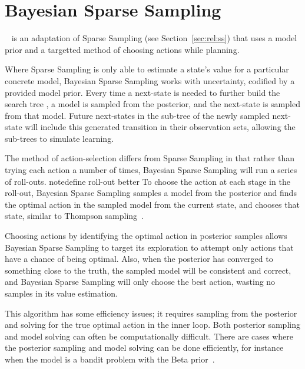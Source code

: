\section{Bayesian Sparse Sampling}

~\cite{wang05} is an adaptation of Sparse Sampling (see Section~\ref{sec:rel:ss}) that uses a model prior and a targetted method of choosing actions while planning.

Where Sparse Sampling  is only able to estimate a state's value for a particular concrete model, Bayesian Sparse Sampling works with uncertainty, codified by a provided model prior. Every time a next-state is needed to further build the search tree  , a model is sampled from the posterior, and the next-state is sampled from that model. Future next-states in the sub-tree of the newly sampled next-state will include this generated transition in their observation sets, allowing the sub-trees to simulate learning. 

The method of action-selection differs from Sparse Sampling in that rather than trying each action a number of times, Bayesian Sparse Sampling will run a series of roll-outs. note{define roll-out better} To choose the action at each stage in the roll-out, Bayesian Sparse Sampling samples a model from the posterior and finds the optimal action in the sampled model from the current state, and chooses that state, similar to Thompson sampling~\cite{thompson33}.


Choosing actions by identifying the optimal action in posterior samples allows Bayesian Sparse Sampling to target its exploration to attempt only actions that have a chance of being optimal. Also, when the posterior has converged to something close to the truth, the sampled model will be consistent and correct, and Bayesian Sparse Sampling will only choose the best action, wasting no samples in its value estimation.

This algorithm has some efficiency issues; it requires sampling from the posterior and solving for the true optimal action in the inner loop. Both posterior sampling and model solving can often be computationally difficult. There are cases where the posterior sampling and model solving can be done efficiently, for instance when the model is a bandit problem with the Beta prior~\cite{wang05}.



